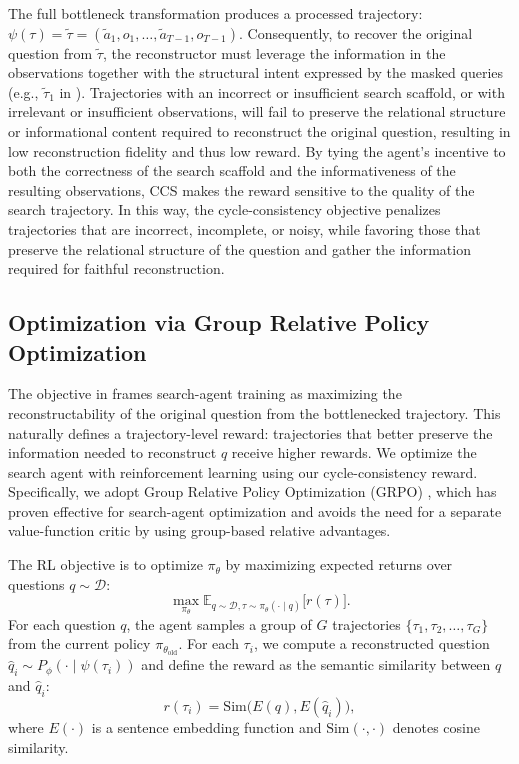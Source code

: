 The full bottleneck transformation produces a processed trajectory: $\psi(\tau) = \tilde{\tau} = (\tilde{a}_1, o_1, \ldots, \tilde{a}_{T-1}, o_{T-1})$.
Consequently, to recover the original question from $\tilde{\tau}$, the reconstructor must leverage the information in the observations together with the structural intent expressed by the masked queries (e.g., $\tilde{\tau}_1$ in ).
Trajectories with an incorrect or insufficient search scaffold, or with irrelevant or insufficient observations, will fail to preserve the relational structure or informational content required to reconstruct the original question, resulting in low reconstruction fidelity and thus low reward.
By tying the agent's incentive to both the correctness of the search scaffold and the informativeness of the resulting observations, CCS makes the reward sensitive to the quality of the search trajectory. In this way, the cycle-consistency objective penalizes trajectories that are incorrect, incomplete, or noisy, while favoring those that preserve the relational structure of the question and gather the information required for faithful reconstruction.


\subsection{Optimization via Group Relative Policy Optimization}
The objective in  frames search-agent training as maximizing the reconstructability of the original question from the bottlenecked trajectory. This naturally defines a trajectory-level reward: trajectories that better preserve the information needed to reconstruct $q$ receive higher rewards.
We optimize the search agent with reinforcement learning using our cycle-consistency reward. Specifically, we adopt Group Relative Policy Optimization (GRPO) \citep{grpo}, which has proven effective for search-agent optimization \citep{search-r1} and avoids the need for a separate value-function critic by using group-based relative advantages.

The RL objective is to optimize $\pi_\theta$ by maximizing expected returns over questions $q\sim\mathcal{D}$:
\begin{equation}
    \max_{\pi_\theta} \mathbb{E}_{q \sim \mathcal{D}, \tau \sim \pi_\theta(\cdot\mid q)} \big[r(\tau)\big].
\end{equation}
For each question $q$, the agent samples a group of $G$ trajectories $\{\tau_1,\tau_2,\dots,\tau_G\}$ from the current policy $\pi_{\theta_{\text{old}}}$. For each $\tau_i$, we compute a reconstructed question $\hat{q}_i \sim P_\phi(\cdot \mid \psi(\tau_i))$ and define the reward as the semantic similarity between $q$ and $\hat{q}_i$:
\begin{equation}
    r(\tau_i) = \mathrm{Sim}\big(E(q), E(\hat{q}_i)\big),
    \label{eq:embedding_sim}
\end{equation}
where $E(\cdot)$ is a sentence embedding function and $\mathrm{Sim}(\cdot,\cdot)$ denotes cosine similarity.

